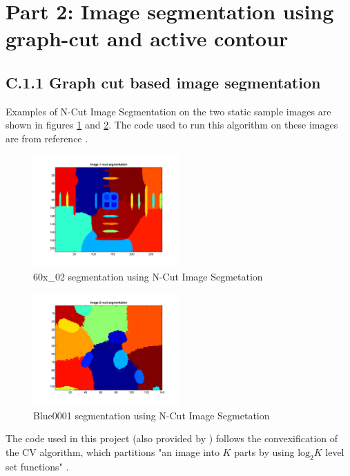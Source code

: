 \documentclass{article}
\begin{document}
\clearpage
\section*{Part 2: Image segmentation using graph-cut and active contour}

\subsection*{C.1.1 Graph cut based image segmentation}



Examples of N-Cut Image Segmentation on the two static sample images are shown in figures \ref{fig:gc1_1} and \ref{fig:gc1_2}. The code used to run this algorithm on these images are from reference \cite{ncut_code}.

\begin{figure}
\centering
\includegraphics[width=0.5\textwidth]{figures/60x_02_gc1.pdf}
\caption{60x\_02 segmentation using N-Cut Image Segmetation}
\label{fig:gc1_1}
\end{figure}

\begin{figure}
\centering
\includegraphics[width=0.5\textwidth]{figures/Blue0001_gc1.pdf}
\caption{Blue0001 segmentation using N-Cut Image Segmetation}
\label{fig:gc1_2}
\end{figure}



 The code used in this project (also provided by \cite{jun}) follows the convexification of the CV algorithm, which partitions "an image into $K$ parts by using $\text{log}_2 K$ level set functions" \cite{jun}. 
\end{document}
